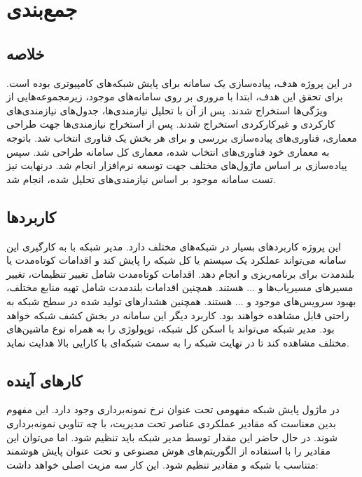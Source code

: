 \chapter{جمع‌بندی}

\section{خلاصه}

در این پروژه هدف، پیاده‌سازی یک سامانه برای پایش شبکه‌های کامپیوتری بوده است. برای تحقق این هدف، ابتدا با مروری بر روی سامانه‌های موجود، زیرمجموعه‌هایی از ویژگی‌ها استخراج شدند. پس از آن با تحلیل نیازمندی‌ها، جدول‌های نیازمندی‌های کارکردی و غیرکارکردی استخراج شدند. پس از استخراج نیازمندی‌ها جهت طراحی معماری، فناوری‌های پیاده‌سازی بررسی و برای هر بخش یک فناوری انتخاب شد. باتوجه به معماری خود فناوری‌های انتخاب شده، معماری کل سامانه طراحی شد. سپس پیاده‌سازی بر اساس ماژول‌های مختلف جهت توسعه نرم‌افزار انجام شد. درنهایت نیز تست سامانه موجود بر اساس نیازمندی‌های تحلیل شده، انجام شد.


\section{کاربرد‌ها}

این پروژه کاربرد‌های بسیار در شبکه‌های مختلف دارد. مدیر شبکه با به کارگیری این سامانه می‌تواند عملکرد یک سیستم یا کل شبکه را پایش کند و اقدامات کوتاه‌مدت یا بلندمدت برای برنامه‌ریزی و انجام دهد. اقدامات کوتاه‌مدت شامل تغییر تنظیمات، تغییر مسیرهای مسیریاب‌ها و ... هستند. همچنین اقدامات بلندمدت شامل تهیه منابع مختلف، بهبود سرویس‌های موجود و ... هستند. همچنین هشدارهای تولید شده در سطح شبکه به راحتی قابل مشاهده خواهند بود. کاربرد دیگر این سامانه در بخش کشف شبکه خواهد بود. مدیر شبکه می‌تواند با اسکن کل شبکه، توپولوژی را به همراه نوع ماشین‌های مختلف مشاهده کند تا در نهایت شبکه را به سمت شبکه‌ای با کارایی بالا هدایت نماید.

\newpage

\section{کار‌های آینده}

در ماژول پایش شبکه مفهومی تحت عنوان نرخ نمونه‌برداری وجود دارد. این مفهوم بدین معناست که مقادیر عملکردی عناصر تحت مدیریت، با چه تناوبی نمونه‌برداری شوند. در حال حاضر این مقدار توسط مدیر شبکه باید تنظیم شود. اما می‌توان این مقادیر را با استفاده از الگوریتم‌های هوش مصنوعی و تحت عنوان پایش هوشمند متناسب با شبکه و مقادیر تنظیم شود. این کار سه مزیت اصلی خواهد داشت:

